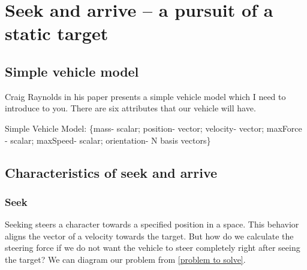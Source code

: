 \documentclass[10pt,twoside,english,a4paper]{article}
\begin{document}
\section{Seek and arrive – a pursuit of a static target} \label{seek and arrive}

\subsection{Simple vehicle model} \label{model}
Craig Raynolds in his paper \cite{Raynolds} presents a simple vehicle model which I need to introduce to you. There are six attributes that our vehicle will have. 

Simple Vehicle Model: \{mass- scalar; position- vector; velocity-	vector; maxForce - scalar; maxSpeed- scalar; orientation- N basis vectors\}

\subsection{Characteristics of seek and arrive } \label{characterictics of seek and arrive}

\subsubsection{Seek} \label{seek}

Seeking steers a character towards a specified position in a space. This behavior aligns the vector of a velocity towards the target. But how do we calculate the steering force if we do not want the vehicle to steer completely right after seeing the target? We can diagram our problem from \ref{problem to solve}.
\end{document}
